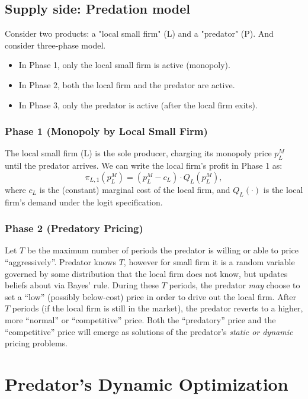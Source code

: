 \documentclass[12pt,oneside]{article}
\theoremstyle{definition}
\theoremstyle{remark}
\begin{document}
\subsection{Supply side: Predation model}
Consider two products: a "local small firm" (L) and a "predator" (P). And consider three-phase model.

\begin{itemize}[leftmargin=2em]
    \item In Phase 1, only the local small firm is active (monopoly).
    \item In Phase 2, both the local firm and the predator are active.
    \item In Phase 3, only the predator is active (after the local firm exits).
\end{itemize}

\subsubsection{Phase 1 (Monopoly by Local Small Firm)}
The local small firm (L) is the sole producer, charging its monopoly price $p_{L}^{M}$ until the predator arrives. We can write the local firm's profit in Phase 1 as:
\begin{equation}
\pi_{L,1}(p_L^M) = (p_L^M - c_L) \cdot Q_L(p_L^M),
\end{equation}
where $c_L$ is the (constant) marginal cost of the local firm, and $Q_L(\cdot)$ is the local firm's demand under the logit specification.

\subsubsection{Phase 2 (Predatory Pricing)}
Let $T$ be the maximum number of periods the predator is willing or able to price ``aggressively''. Predator knows $T$, however for small firm it is a random variable governed by some distribution that the local firm does not know, but updates beliefs about via Bayes' rule.
During these $T$ periods, the predator \emph{may} choose to set a ``low'' (possibly below-cost) price in order to drive out the local firm. After $T$ periods (if the local firm is still in the market), the predator reverts to a higher, more ``normal'' or ``competitive'' price. 
Both the ``predatory'' price and the ``competitive'' price will emerge as solutions of the predator's \emph{static or dynamic} pricing problems.

\section{Predator's Dynamic Optimization}
\end{document}
